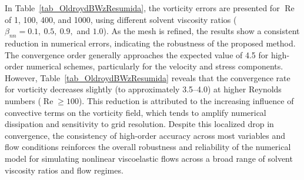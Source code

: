 \documentclass[preprint, 12pt]{elsarticle}
\begin{document}
In Table~\ref{tab_OldroydBWzResumida}, the vorticity errors are presented for $\operatorname{Re}$ of 1, 100, 400, and 1000, using different solvent viscosity ratios ($\beta_{nn} = 0.1,\ 0.5,\ 0.9,$ and $1.0$). As the mesh is refined, the results show a consistent reduction in numerical errors, indicating the robustness of the proposed method. The convergence order generally approaches the expected value of 4.5 for high-order numerical schemes, particularly for the velocity and stress components. However, Table~\ref{tab_OldroydBWzResumida} reveals that the convergence rate for vorticity decreases slightly (to approximately 3.5–4.0) at higher Reynolds numbers ($\operatorname{Re} \geq 100$). This reduction is attributed to the increasing influence of convective terms on the vorticity field, which tends to amplify numerical dissipation and sensitivity to grid resolution. Despite this localized drop in convergence, the consistency of high-order accuracy across most variables and flow conditions reinforces the overall robustness and reliability of the numerical model for simulating nonlinear viscoelastic flows across a broad range of solvent viscosity ratios and flow regimes.
\end{document}
